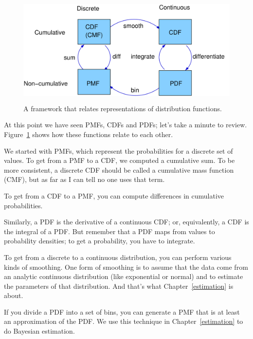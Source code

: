 \documentclass[12pt]{book}
\begin{document}
\begin{figure}
\centerline{\includegraphics[height=2.2in]{figs/distribution_functions.pdf}}
\caption{A framework that relates representations of distribution
functions.}
\label{dist_framework}
\end{figure}

At this point we have seen PMFs, CDFs and PDFs; let's take a minute
to review.  Figure~\ref{dist_framework} shows how these functions relate
to each other.

We started with PMFs, which represent the probabilities for a discrete
set of values.  To get from a PMF to a CDF, we computed a cumulative sum.
To be more consistent, a discrete CDF should be called a cumulative mass
function (CMF), but as far as I can tell no one uses that term.

To get from a CDF to a PMF, you can compute differences in cumulative
probabilities.

Similarly, a PDF is the derivative of a continuous CDF; or, equivalently,
a CDF is the integral of a PDF.  But remember that a PDF maps from
values to probability densities; to get a probability, you have to
integrate.

To get from a discrete to a continuous distribution, you can perform
various kinds of smoothing.  One form of smoothing is to assume that
the data come from an analytic continuous distribution
(like exponential or normal) and to estimate the parameters of that
distribution.  And that's what Chapter~\ref{estimation} is about.

If you divide a PDF into a set of bins, you can generate a PMF that is
at least an approximation of the PDF.  We use this
technique in Chapter~\ref{estimation} to do Bayesian estimation.
\end{document}
